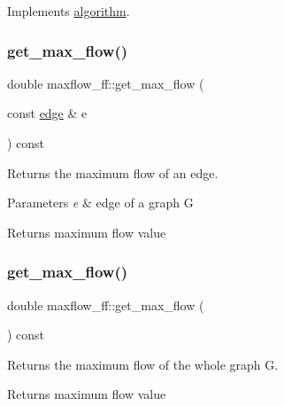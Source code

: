 Implements \mbox{\hyperlink{classalgorithm_a05c0f25463eb35a77b2d73fc06bb2c0e}{algorithm}}.

\mbox{\label{classmaxflow__ff_a4c120a7ea9be23d908036ebd2fb9298c}} 
\subsubsection{\texorpdfstring{get\+\_\+max\+\_\+flow()}{get\_max\_flow()}\hspace{0.1cm}{\footnotesize\ttfamily [1/2]}}
{\footnotesize\ttfamily double maxflow\+\_\+ff\+::get\+\_\+max\+\_\+flow (\begin{DoxyParamCaption}\item[{const \mbox{\hyperlink{classedge}{edge}} \&}]{e }\end{DoxyParamCaption}) const}

Returns the maximum flow of an edge.


\begin{DoxyParams}{Parameters}
{\em e} & edge of a graph G \\
\hline
\end{DoxyParams}
\begin{DoxyReturn}{Returns}
maximum flow value 
\end{DoxyReturn}
\mbox{\label{classmaxflow__ff_a04d1ea509c13e500b62cad061ee8a2b9}} 
\subsubsection{\texorpdfstring{get\+\_\+max\+\_\+flow()}{get\_max\_flow()}\hspace{0.1cm}{\footnotesize\ttfamily [2/2]}}
{\footnotesize\ttfamily double maxflow\+\_\+ff\+::get\+\_\+max\+\_\+flow (\begin{DoxyParamCaption}{ }\end{DoxyParamCaption}) const}

Returns the maximum flow of the whole graph G.

\begin{DoxyReturn}{Returns}
maximum flow value 
\end{DoxyReturn}
\mbox{\label{classmaxflow__ff_a3b66acf996ff5be94de8b2cfdb3164c3}} 
